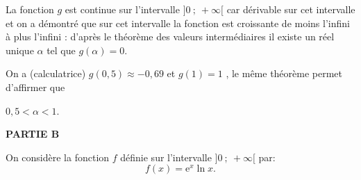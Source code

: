 \documentclass[10pt]{article}
\providecommand{\e}{{\mathrm{e}}}
\begin{document}
\begin{enumerate}
La fonction $g$ est continue sur l'intervalle $]0~;~+\infty[$ car dérivable sur cet intervalle et on a démontré que sur cet intervalle la fonction est croissante de moins l'infini à plus l'infini : d'après le théorème des valeurs intermédiaires il existe un réel unique $\alpha$ tel que $g(\alpha) = 0$.

On a (calculatrice) $g(0,5) \approx - 0,69$ et $g(1) = 1$ , le même théorème permet d'affirmer que 

$0,5 < \alpha < 1$.
\end{enumerate}

\medskip

\textbf{PARTIE B}

\medskip

On considère la fonction $f$ définie sur l'intervalle $]0~;~+\infty[$ par: 
\[f(x) = \e^x \ln x.\]
\end{document}
